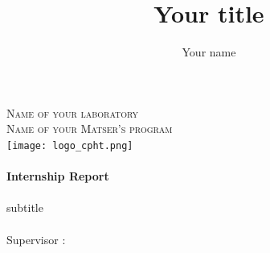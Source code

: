 \documentclass[12pt]{article}
\author{Your name}
\title{Your title
}
\begin{document}
\makeatletter 
	\begin{titlepage} 
	\centering 
		{\large \textsc{Name of your laboratory}}\\ 
		\textsc{Name of your Matser's program}\\ 
	\vspace{1cm} 
		\texttt{[image: logo\_cpht.png]} \\
	\vspace{1cm} 
		{\large\textbf{	\@date\\
		 Internship Report}}\\ 
	\vfill 
		{\huge \textbf{\@title}} \\  \vspace{0.5cm}
		\LARGE subtitle \\
	\vspace{2em} 
		{\large \@author} \\ 
	\vfill 
		{\large Supervisor : } \\
	\end{titlepage} 
\makeatother

\tableofcontents
\end{document}
